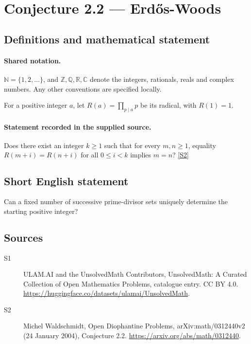 \documentclass[11pt]{article}
\newcommand{\sref}[2]{\hyperlink{source:#1:#2}{[S#2]}}
\begin{document}
\section{Conjecture 2.2 — Erdős-Woods}\label{statement}

\subsection{Definitions and mathematical statement}

\paragraph{Shared notation.}$\mathbb N=\{1,2,\ldots\}$, and $\mathbb Z,\mathbb Q,\mathbb R,\mathbb C$ denote the integers, rationals, reals and complex numbers. Any other conventions are specified locally.


For a positive integer $a$, let $R(a)=\prod_{p\mid a}p$ be its radical, with $R(1)=1$.
\paragraph{Statement recorded in the supplied source.}
Does there exist an integer $k\ge1$ such that for every $m,n\ge1$, equality $R(m+i)=R(n+i)$ for all $0\le i<k$ implies $m=n$? \sref{statement}{2}
\subsection{Short English statement}
Can a fixed number of successive prime-divisor sets uniquely determine the starting positive integer?
\subsection{Sources}
\begin{description}
\item[\hypertarget{source:statement:1}{S1}] ULAM.AI and the UnsolvedMath Contributors, UnsolvedMath: A Curated Collection of Open Mathematics Problems, catalogue entry. CC BY 4.0. \url{https://huggingface.co/datasets/ulamai/UnsolvedMath}.
\item[\hypertarget{source:statement:2}{S2}] Michel Waldschmidt, Open Diophantine Problems, arXiv:math/0312440v2 (24 January 2004), Conjecture 2.2. \url{https://arxiv.org/abs/math/0312440}.
\end{description}
\label{end:statement}
\end{document}
